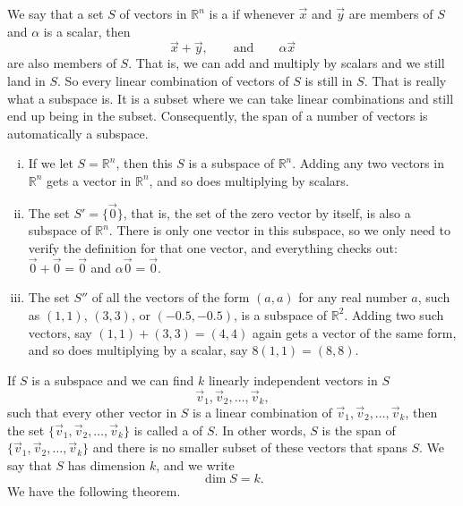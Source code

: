 We say that a set $S$ of vectors in ${\mathbb R}^n$ is a
\emph{} if
whenever $\vec{x}$ and $\vec{y}$ are members of $S$ and
$\alpha$ is a scalar, then
\begin{equation*}
\vec{x} + \vec{y}, \qquad \text{and} \qquad \alpha \vec{x}
\end{equation*}
are also members of $S$.  That is, we can add and multiply by scalars
and we still land in $S$.  So every linear combination of vectors of
$S$ is still in $S$.  That is really what a subspace is.  It is a subset
where we can take linear combinations and still end up being in the subset.
Consequently, the span of a number of vectors is automatically a subspace.

\begin{example} \label{example:simplesubspaces}
\begin{enumerate}[(i)]
\item
If we let $S = {\mathbb R}^n$, then this $S$ is a subspace of
${\mathbb R}^n$.  Adding any two vectors in ${\mathbb R}^n$ gets a vector in
${\mathbb R}^n$, and so does multiplying by scalars.
\item
The set $S' = \{ \vec{0} \}$, that is,
the set of the zero vector by itself, is
also a subspace of ${\mathbb R}^n$.  There is only one vector in this
subspace, so we only need to verify the definition for that one vector, and everything checks
out: $\vec{0}+\vec{0} = \vec{0}$ and $\alpha \vec{0} = \vec{0}$.
\item
The set $S''$ of all the vectors of the form
$(a,a)$ for any real number $a$, such as $(1,1)$, $(3,3)$, or $(-0.5,-0.5)$,
is a subspace of ${\mathbb R}^2$.  Adding two such vectors, say
$(1,1)+(3,3) = (4,4)$ again gets a vector of the same form, and so does
multiplying by a scalar, say $8(1,1) = (8,8)$.
\end{enumerate}
\end{example}

If $S$ is a subspace and we can find $k$ linearly independent vectors in $S$
\begin{equation*}
\vec{v}_1, \vec{v}_2, \ldots, \vec{v}_k ,
\end{equation*}
such that every other vector in $S$ is a linear combination of $\vec{v}_1,
\vec{v}_2,\ldots, \vec{v}_k$,
then the set
$\{ \vec{v}_1, \vec{v}_2, \ldots, \vec{v}_k \}$ is called a
\emph{} of $S$.  In other words, $S$
is the span of
$\{ \vec{v}_1, \vec{v}_2, \ldots, \vec{v}_k \}$
and there is no smaller subset of these vectors that spans $S$.
We say that $S$ has dimension $k$,
and we write
\begin{equation*}
\dim S = k .
\end{equation*}
We have the following theorem.

